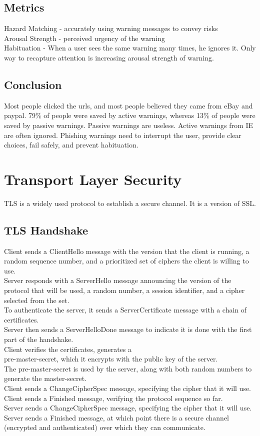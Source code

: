 \subsection{Metrics}
Hazard Matching - accurately using warning messages to convey risks\\
Arousal Strength - perceived urgency of the warning\\
Habituation - When a user sees the same warning many times, he ignores it. Only way to recapture attention is increasing arousal strength of warning.
\subsection{Conclusion}
Most people clicked the urls, and most people believed they came from eBay and paypal. 79\% of people were saved by active warnings, whereas 13\% of people were saved by passive warnings. Passive warnings are useless. Active warnings from IE are often ignored. Phishing warnings need to interrupt the user, provide clear choices, fail safely, and prevent habituation.

\section{Transport Layer Security}
TLS is a widely used protocol to establish a secure channel. It is a version of SSL.
\subsection{TLS Handshake}
Client sends a ClientHello message with the version that the client is running, a random sequence number, and a prioritized set of ciphers the client is willing to use.\\
Server responds with a ServerHello message announcing the version of the protocol that will be used, a random number, a session identifier, and a cipher selected from the set.\\
To authenticate the server, it sends a ServerCertificate message with a chain of certificates.\\
Server then sends a ServerHelloDone message to indicate it is done with the first part of the handshake.\\
Client verifies the certificates, generates a \\
pre-master-secret, which it encrypts with the public key of the server.\\
The pre-master-secret is used by the server, along with both random numbers to generate the master-secret.\\
Client sends a ChangeCipherSpec message, specifying the cipher that it will use.\\
Client sends a Finished message, verifying the protocol sequence so far.\\
Server sends a ChangeCipherSpec message, specifying the cipher that it will use.\\
Server sends a Finished message, at which point there is a secure channel (encrypted and authenticated) over which they can communicate.
